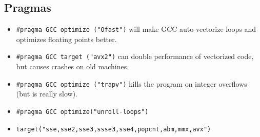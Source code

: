 	\subsection{Pragmas}
		\begin{itemize}
			\item \lstinline{#pragma GCC optimize ("Ofast")} will make GCC auto-vectorize loops and optimizes floating points better.
			\item \lstinline{#pragma GCC target ("avx2")} can double performance of vectorized code, but causes crashes on old machines.
			\item \lstinline{#pragma GCC optimize ("trapv")} kills the program on integer overflows (but is really slow).
			\item \lstinline{#pragma GCC optimize("unroll-loops")}
			\item \lstinline{target("sse,sse2,sse3,ssse3,sse4,popcnt,abm,mmx,avx")}
		\end{itemize}
